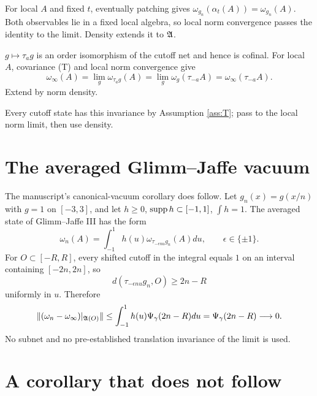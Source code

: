 \documentclass[11pt,a4paper]{article}
\begin{document}
\Because For local $A$ and fixed $t$, eventually patching gives
$\omega_{g_n}(\alpha_t(A))=\omega_{g_n}(A)$.  Both observables lie in a fixed
local algebra, so local norm convergence passes the identity to the limit.  Density
extends it to $\mathfrak A$.

\QedStep



\Because $g\mapsto\tau_ag$ is an order isomorphism of the cutoff net and hence is
cofinal.  For local $A$, covariance (T) and local norm convergence give
\[
 \omega_\infty(A)=\lim_g\omega_{\tau_ag}(A)
 =\lim_g\omega_g(\tau_{-a}A)=\omega_\infty(\tau_{-a}A).
\]
Extend by norm density.


\Because Every cutoff state has this invariance by Assumption \ref{ass:T}; pass to
the local norm limit, then use density.

\QedStep

\section{The averaged Glimm--Jaffe vacuum}

The manuscript's canonical-vacuum corollary does follow.  Let
$g_n(x)=g(x/n)$ with $g=1$ on $[-3,3]$, and let
$h\geq0$, $\operatorname{supp} h\subset[-1,1]$, $\int h=1$.  The averaged state of Glimm--Jaffe
III has the form
\[
 \omega_n(A)=\int_{-1}^1h(u)\omega_{\tau_{-\epsilon nu}g_n}(A)du,
 \qquad \epsilon\in\{\pm1\}.
\]
For $O\subset[-R,R]$, every shifted cutoff in the integral equals $1$ on an
interval containing $[-2n,2n]$, so
\[
 d(\tau_{-\epsilon nu}g_n,O)\geq2n-R
\]
uniformly in $u$.  Therefore
\[
 \|(\omega_n-\omega_\infty)|_{\mathfrak A(O)}\|
 \leq\int_{-1}^1h(u)\Psi_\gamma(2n-R)du
 =\Psi_\gamma(2n-R)\longrightarrow0.
\]
No subnet and no pre-established translation invariance of the limit is used.

\section{A corollary that does not follow}
\end{document}
